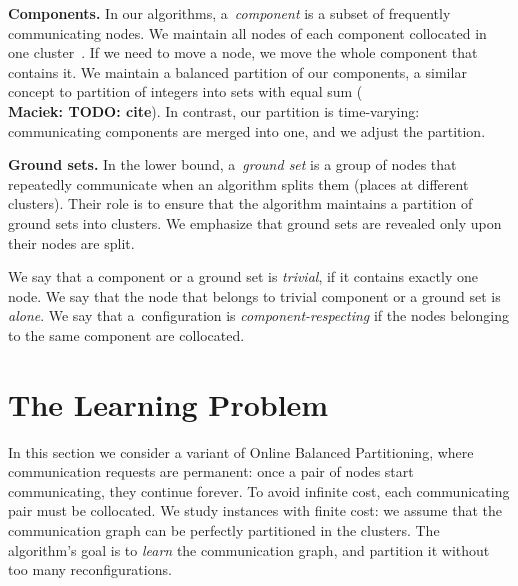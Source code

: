 \documentclass[manuscript,screen=true, review, anonymous]{acmart}
\newcommand\maciek[1]{\color{brown}\textbf{\\ Maciek: #1}\color{black}}
\begin{document}
\noindent
\textbf{Components.}
In our algorithms, a~\emph{component} is a subset of frequently communicating nodes.
We maintain all nodes of each component collocated in one cluster~\cite{repartition-disc}.
If we need to move a node, we move the whole component that contains it.
We maintain a balanced partition of our components, a similar concept to partition of integers into sets with equal sum (\maciek{TODO: cite}).
In contrast, our partition is time-varying: communicating components are merged into one, and we adjust the partition.

\noindent
\textbf{Ground sets.}
In the lower bound, a~\emph{ground set} is a group of nodes that repeatedly communicate when an algorithm splits them (places at different clusters).
Their role is to ensure that the algorithm maintains a partition of ground sets into clusters.
We emphasize that ground sets are revealed only upon their nodes are split.


We say that a component or a ground set is \emph{trivial}, if it contains exactly one node.
We say that the node that belongs to trivial component or a ground set is \emph{alone}.
We say that a~configuration is \emph{component-respecting}
if the nodes belonging to the same component are collocated.



\section{The Learning Problem} %

In this section we consider a variant of Online Balanced Partitioning, where communication requests are permanent: once a pair of nodes start communicating, they continue forever.
To avoid infinite cost, each communicating pair must be collocated.
We study instances with finite cost: we assume that the communication graph can be perfectly partitioned in the clusters.
The algorithm's goal is to \emph{learn} the communication graph, and partition it without too many reconfigurations.
\end{document}
